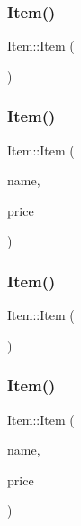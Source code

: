 \subsubsection{\texorpdfstring{Item()}{Item()}\hspace{0.1cm}{\footnotesize\ttfamily [1/4]}}
{\footnotesize\ttfamily Item\+::\+Item (\begin{DoxyParamCaption}{ }\end{DoxyParamCaption})}

\mbox{\label{class_item_a53775715216c52abe8b935716fe2f9c0}} 
\subsubsection{\texorpdfstring{Item()}{Item()}\hspace{0.1cm}{\footnotesize\ttfamily [2/4]}}
{\footnotesize\ttfamily Item\+::\+Item (\begin{DoxyParamCaption}\item[{Q\+String}]{name,  }\item[{double}]{price }\end{DoxyParamCaption})}

\mbox{\label{class_item_a297720c02984eab37332ae795d22189d}} 
\subsubsection{\texorpdfstring{Item()}{Item()}\hspace{0.1cm}{\footnotesize\ttfamily [3/4]}}
{\footnotesize\ttfamily Item\+::\+Item (\begin{DoxyParamCaption}{ }\end{DoxyParamCaption})}

\mbox{\label{class_item_a6cfc53bbd2fd57070674ba1ba684688f}} 
\subsubsection{\texorpdfstring{Item()}{Item()}\hspace{0.1cm}{\footnotesize\ttfamily [4/4]}}
{\footnotesize\ttfamily Item\+::\+Item (\begin{DoxyParamCaption}\item[{Q\+String}]{name,  }\item[{Q\+String}]{price }\end{DoxyParamCaption})}



